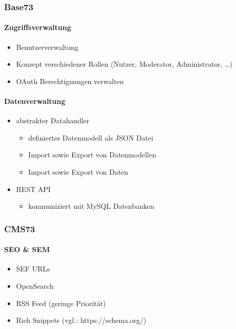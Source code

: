 \subsubsection{Base73}
    \paragraph{Zugriffsverwaltung}
        \begin{itemize}
            \item Benutzerverwaltung
            \item Konzept verschiedener Rollen (Nutzer, Moderator, Administrator, \ldots)
            \item OAuth Berechtignungen verwalten
        \end{itemize}
    \paragraph{Datenverwaltung}
		\begin{itemize}
			\item abstrakter Datahandler
                \begin{itemize}
                    \item definiertes Datenmodell als JSON Datei
                    \item Import sowie Export von Datenmodellen
                    \item Import sowie Export von Daten
                \end{itemize}
            \item REST API
                \begin{itemize}
                    \item kommuniziert mit MySQL Datenbanken
                \end{itemize}
		\end{itemize}

\subsubsection{CMS73}
	\paragraph{SEO \& SEM}
		\begin{itemize}
			\item SEF URLs
			\item OpenSearch
			\item RSS Feed (geringe Priorität)
			\item Rich Snippets (vgl.: https://schema.org/)
		\end{itemize}
	
